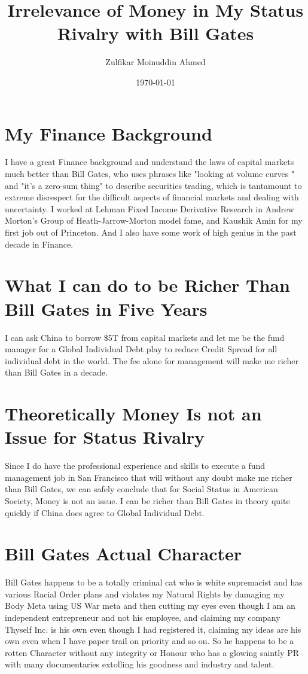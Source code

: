 \documentclass{amsart}
\title{Irrelevance of Money in My Status Rivalry with Bill Gates}
\author{Zulfikar Moinuddin Ahmed}
\date{\today}
\begin{document}
\maketitle

\section{My Finance Background}
I have a great Finance background and understand the laws of capital markets much better than Bill Gates, who uses phrases like "looking at volume curves " and "it's a zero-sum thing" to describe securities trading, which is tantamount to extreme disrespect for the difficult aspects of financial markets and dealing with uncertainty.  I worked at Lehman Fixed Income Derivative Research in Andrew Morton's Group of Heath-Jarrow-Morton model fame, and Kaushik Amin for my first job out of Princeton.  And I also have some work of high genius in the past decade in Finance.

\section{What I can do to be Richer Than Bill Gates in Five Years}

I can ask China to borrow \$5T from capital markets and let me be the fund manager for a Global Individual Debt play to reduce Credit Spread for all individual debt in the world.  The fee alone for management will make me richer than Bill Gates in a decade.

\section{Theoretically Money Is not an Issue for Status Rivalry}

Since I do have the professional experience and skills to execute a fund management job in San Francisco that will without any doubt make me richer than Bill Gates, we can safely conclude that for Social Status in American Society, Money is not an issue.  I can be richer than Bill Gates in theory quite quickly if China does agree to Global Individual Debt.

\section{Bill Gates Actual Character}
Bill Gates happens to be a totally criminal cat who is white supremacist and has various Racial Order plans and violates my Natural Rights by damaging my Body Meta using US War meta and then cutting my eyes even though I am an independent entrepreneur and not his employee, and claiming my company Thyself Inc. is his own even though I had registered it, claiming my ideas are his own even when I have paper trail on priority and so on.  So he happens to be a rotten Character without any integrity or Honour who has a glowing saintly PR with many documentaries extolling his goodness and industry and talent.
\end{document}
